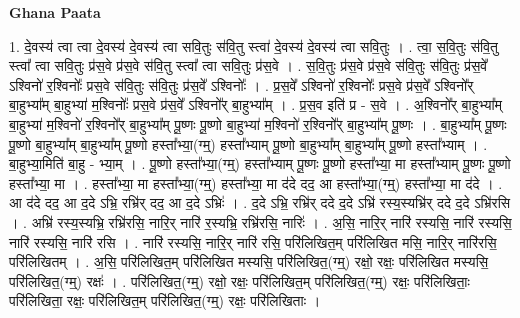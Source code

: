 \documentclass[17pt]{extarticle}
\begin{document}
\textbf{Ghana Paata } \newline

1. दे॒वस्य॑ त्वा त्वा दे॒वस्य॑ दे॒वस्य॑ त्वा सवि॒तुः स॑वि॒तु स्त्वा॑ दे॒वस्य॑ दे॒वस्य॑ त्वा सवि॒तुः । . त्वा॒ स॒वि॒तुः स॑वि॒तु स्त्वा᳚ त्वा सवि॒तुः प्र॑स॒वे प्र॑स॒वे स॑वि॒तु स्त्वा᳚ त्वा सवि॒तुः प्र॑स॒वे । . स॒वि॒तुः प्र॑स॒वे प्र॑स॒वे स॑वि॒तुः स॑वि॒तुः प्र॑स॒वे᳚ ऽश्विनो॑ र॒श्विनोः᳚ प्रस॒वे स॑वि॒तुः स॑वि॒तुः प्र॑स॒वे᳚ ऽश्विनोः᳚ । . प्र॒स॒वे᳚ ऽश्विनो॑ र॒श्विनोः᳚ प्रस॒वे प्र॑स॒वे᳚ ऽश्विनो᳚र् बा॒हुभ्या᳚म् बा॒हुभ्या॑ म॒श्विनोः᳚ प्रस॒वे प्र॑स॒वे᳚ ऽश्विनो᳚र् बा॒हुभ्या᳚म् । . प्र॒स॒व इति॑ प्र - स॒वे । . अ॒श्विनो᳚र् बा॒हुभ्या᳚म् बा॒हुभ्या॑ म॒श्विनो॑ र॒श्विनो᳚र् बा॒हुभ्या᳚म् पू॒ष्णः पू॒ष्णो बा॒हुभ्या॑ म॒श्विनो॑ र॒श्विनो᳚र् बा॒हुभ्या᳚म् पू॒ष्णः । . बा॒हुभ्या᳚म् पू॒ष्णः पू॒ष्णो बा॒हुभ्या᳚म् बा॒हुभ्या᳚म् पू॒ष्णो हस्ता᳚भ्या॒(ग्म्॒) हस्ता᳚भ्याम् पू॒ष्णो बा॒हुभ्या᳚म् बा॒हुभ्या᳚म् पू॒ष्णो हस्ता᳚भ्याम् । . बा॒हुभ्या॒मिति॑ बा॒हु - भ्या॒म् । . पू॒ष्णो हस्ता᳚भ्या॒(ग्म्॒) हस्ता᳚भ्याम् पू॒ष्णः पू॒ष्णो हस्ता᳚भ्या॒ मा हस्ता᳚भ्याम् पू॒ष्णः पू॒ष्णो हस्ता᳚भ्या॒ मा । . हस्ता᳚भ्या॒ मा हस्ता᳚भ्या॒(ग्म्॒) हस्ता᳚भ्या॒ मा द॑दे दद॒ आ हस्ता᳚भ्या॒(ग्म्॒) हस्ता᳚भ्या॒ मा द॑दे । . आ द॑दे दद॒ आ द॒दे ऽभ्रि॒ रभ्रि॑र् दद॒ आ द॒दे ऽभ्रिः॑ । . द॒दे ऽभ्रि॒ रभ्रि॑र् ददे द॒दे ऽभ्रि॑ रस्य॒स्यभ्रि॑र् ददे द॒दे ऽभ्रि॑रसि । . अभ्रि॑ रस्य॒स्यभ्रि॒ रभ्रि॑रसि॒ नारि॒र् नारि॑ र॒स्यभ्रि॒ रभ्रि॑रसि॒ नारिः॑ । . अ॒सि॒ नारि॒र् नारि॑ रस्यसि॒ नारि॑ रस्यसि॒ नारि॑ रस्यसि॒ नारि॑ रसि । . नारि॑ रस्यसि॒ नारि॒र् नारि॑ रसि॒ परि॑लिखित॒म् परि॑लिखित मसि॒ नारि॒र् नारि॑रसि॒ परि॑लिखितम् । . अ॒सि॒ परि॑लिखित॒म् परि॑लिखित मस्यसि॒ परि॑लिखित॒(ग्म्॒) रक्षो॒ रक्षः॒ परि॑लिखित मस्यसि॒ परि॑लिखित॒(ग्म्॒) रक्षः॑ । . परि॑लिखित॒(ग्म्॒) रक्षो॒ रक्षः॒ परि॑लिखित॒म् परि॑लिखित॒(ग्म्॒) रक्षः॒ परि॑लिखिताः॒ परि॑लिखिता॒ रक्षः॒ परि॑लिखित॒म् परि॑लिखित॒(ग्म्॒) रक्षः॒ परि॑लिखिताः । \newline
\end{document}
